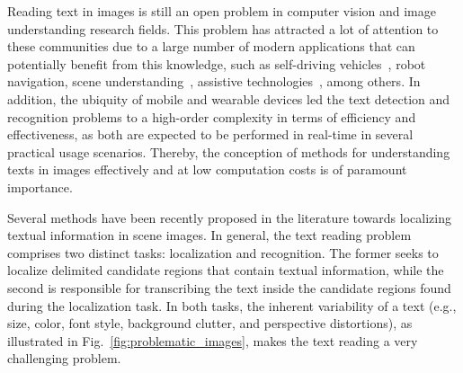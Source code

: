 \label{sec:introduction}

Reading text in images is still an open problem in computer vision and image understanding research fields. This problem has attracted a lot of attention to these communities due to a large number of modern applications that can potentially benefit from this knowledge, such as self-driving vehicles~\cite{Yan2018TITS,Zhu2018TITS}, robot navigation, scene understanding~\cite{Wang2018IJCV}, assistive technologies~\cite{Yi2014TM}, among others. In addition, the ubiquity of mobile and wearable devices led the text detection and recognition problems to a high-order complexity in terms of efficiency and effectiveness, as both are expected to be performed in real-time in several practical usage scenarios. Thereby, the conception of methods for understanding texts in images effectively and at low computation costs is of paramount importance.

Several methods have been recently proposed in the literature towards localizing textual information in scene images. In general, the text reading problem comprises two distinct tasks: localization and recognition. The former seeks to localize delimited candidate regions that contain textual information, while the second is responsible for transcribing the text inside the candidate regions found during the localization task.
In both tasks, the inherent variability of a text (e.g., size, color, font style, background clutter, and perspective distortions), as illustrated in Fig.~\ref{fig:problematic_images},
makes the text reading a very challenging problem.

